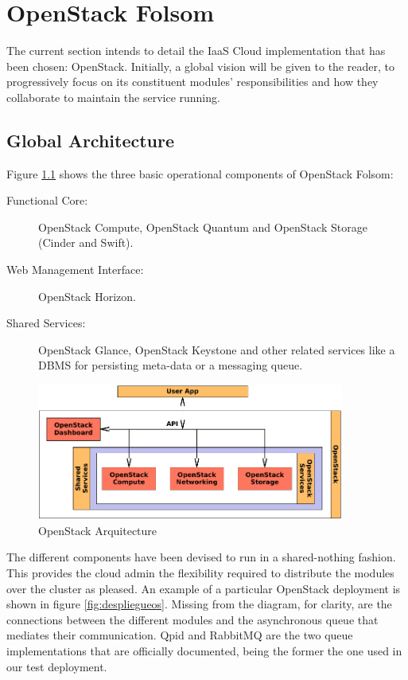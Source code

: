 \chapter{OpenStack Folsom}\label{cap:openstack}
\noindent The current section intends to detail the IaaS Cloud implementation that has been chosen: OpenStack. Initially, a global vision will be given to the reader, to progressively focus on its constituent modules' responsibilities and how they collaborate to maintain the service running.

\section{Global Architecture}\label{sec:arquitecturaglobal}
\noindent Figure \ref{fig:arquitecturaos} shows the three basic operational components of OpenStack Folsom:

\begin{description}
 \item[Functional Core:] OpenStack Compute, OpenStack Quantum and OpenStack Storage (Cinder and Swift).
 \item[Web Management Interface:] OpenStack Horizon.
 \item[Shared Services:] OpenStack Glance, OpenStack Keystone and other related services like a DBMS for persisting meta-data or a messaging queue.
\end{description}

\begin{figure}[tbp]
\begin{center}
\includegraphics[width=0.9\textwidth]{imagenes/012.pdf}
 \caption{OpenStack Arquitecture}
\label{fig:arquitecturaos}
\end{center}
\end{figure}

The different components have been devised to run in a shared-nothing fashion. This provides the cloud admin the flexibility required to distribute the modules over the cluster as pleased. An example of a particular OpenStack deployment is shown in figure \ref{fig:despliegueos}. Missing from the diagram, for clarity, are the connections between the different modules and the asynchronous queue that mediates their communication. Qpid and RabbitMQ are the two queue implementations that are officially documented, being the former the one used in our test deployment.

